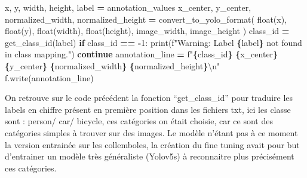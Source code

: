 \documentclass[
  10pt,
]{article}
\newenvironment{Shaded}{\begin{snugshade}}{\end{snugshade}}
\newcommand{\BuiltInTok}[1]{#1}
\newcommand{\CharTok}[1]{\textcolor[rgb]{0.31,0.60,0.02}{#1}}
\newcommand{\ControlFlowTok}[1]{\textcolor[rgb]{0.13,0.29,0.53}{\textbf{#1}}}
\newcommand{\DecValTok}[1]{\textcolor[rgb]{0.00,0.00,0.81}{#1}}
\newcommand{\NormalTok}[1]{#1}
\newcommand{\OperatorTok}[1]{\textcolor[rgb]{0.81,0.36,0.00}{\textbf{#1}}}
\newcommand{\SpecialCharTok}[1]{\textcolor[rgb]{0.81,0.36,0.00}{\textbf{#1}}}
\newcommand{\SpecialStringTok}[1]{\textcolor[rgb]{0.31,0.60,0.02}{#1}}
\begin{document}
\begin{Shaded}
\begin{Highlighting}[]
\NormalTok{            x, y, width, height, label }\OperatorTok{=}\NormalTok{ annotation\_values}
\NormalTok{            x\_center, y\_center, normalized\_width, normalized\_height }\OperatorTok{=}
\NormalTok{                                                                  convert\_to\_yolo\_format(}
                \BuiltInTok{float}\NormalTok{(x), }\BuiltInTok{float}\NormalTok{(y), }\BuiltInTok{float}\NormalTok{(width), }\BuiltInTok{float}\NormalTok{(height), image\_width, image\_height}
\NormalTok{            )}
\NormalTok{            class\_id }\OperatorTok{=}\NormalTok{ get\_class\_id(label)}
            \ControlFlowTok{if}\NormalTok{ class\_id }\OperatorTok{==} \OperatorTok{{-}}\DecValTok{1}\NormalTok{:}
                \BuiltInTok{print}\NormalTok{(}\SpecialStringTok{f"Warning: Label \textquotesingle{}}\SpecialCharTok{\{}\NormalTok{label}\SpecialCharTok{\}}\SpecialStringTok{\textquotesingle{} not found in class mapping."}\NormalTok{)}
                \ControlFlowTok{continue}
\NormalTok{            annotation\_line }\OperatorTok{=}
            \SpecialStringTok{f"}\SpecialCharTok{\{}\NormalTok{class\_id}\SpecialCharTok{\}}\SpecialStringTok{ }\SpecialCharTok{\{}\NormalTok{x\_center}\SpecialCharTok{\}}\SpecialStringTok{ }\SpecialCharTok{\{}\NormalTok{y\_center}\SpecialCharTok{\}}\SpecialStringTok{ }\SpecialCharTok{\{}\NormalTok{normalized\_width}\SpecialCharTok{\}}\SpecialStringTok{ }\SpecialCharTok{\{}\NormalTok{normalized\_height}\SpecialCharTok{\}}\CharTok{\textbackslash{}n}\SpecialStringTok{"}
\NormalTok{            f.write(annotation\_line)}
\end{Highlighting}
\end{Shaded}

On retrouve sur le code précédent la fonction ``get\_class\_id'' pour
traduire les labels en chiffre présent en première position dans les
fichiers txt, ici les classe sont : person/ car/ bicycle, ces catégories
on était choisie, car ce sont des catégories simples à trouver sur des
images. Le modèle n'étant pas à ce moment la version entrainée sur les
collemboles, la création du fine tuning avait pour but d'entrainer un
modèle très généraliste (Yolov5s) à reconnaitre plus précisément ces
catégories.
\end{document}
